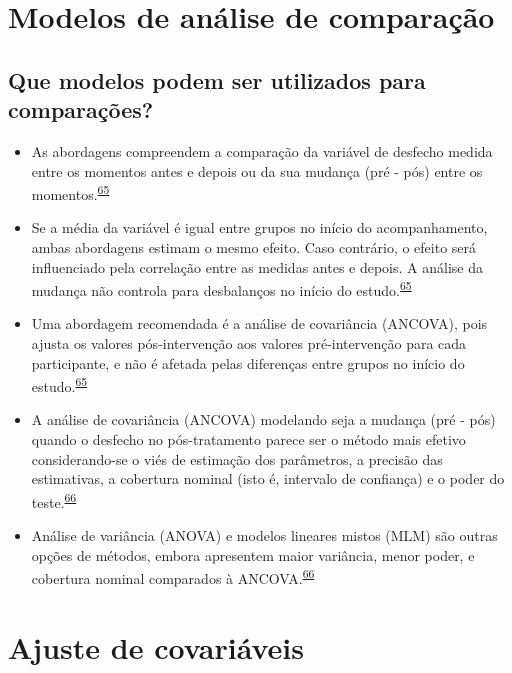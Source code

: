 \documentclass[
]{book}
\begin{document}
\hypertarget{metodos-comparacao}{%
\section{Modelos de análise de comparação}\label{metodos-comparacao}}

\hypertarget{que-modelos-podem-ser-utilizados-para-comparauxe7uxf5es}{%
\subsection{Que modelos podem ser utilizados para comparações?}\label{que-modelos-podem-ser-utilizados-para-comparauxe7uxf5es}}

\begin{itemize}
\item
  As abordagens compreendem a comparação da variável de desfecho medida entre os momentos antes e depois ou da sua mudança (pré - pós) entre os momentos.\textsuperscript{\protect\hyperlink{ref-Vickers2001}{65}}
\item
  Se a média da variável é igual entre grupos no início do acompanhamento, ambas abordagens estimam o mesmo efeito. Caso contrário, o efeito será influenciado pela correlação entre as medidas antes e depois. A análise da mudança não controla para desbalanços no início do estudo.\textsuperscript{\protect\hyperlink{ref-Vickers2001}{65}}
\item
  Uma abordagem recomendada é a análise de covariância (ANCOVA), pois ajusta os valores pós-intervenção aos valores pré-intervenção para cada participante, e não é afetada pelas diferenças entre grupos no início do estudo.\textsuperscript{\protect\hyperlink{ref-Vickers2001}{65}}
\item
  A análise de covariância (ANCOVA) modelando seja a mudança (pré - pós) quando o desfecho no pós-tratamento parece ser o método mais efetivo considerando-se o viés de estimação dos parâmetros, a precisão das estimativas, a cobertura nominal (isto é, intervalo de confiança) e o poder do teste.\textsuperscript{\protect\hyperlink{ref-OConnell2017}{66}}
\item
  Análise de variância (ANOVA) e modelos lineares mistos (MLM) são outras opções de métodos, embora apresentem maior variância, menor poder, e cobertura nominal comparados à ANCOVA.\textsuperscript{\protect\hyperlink{ref-OConnell2017}{66}}
\end{itemize}

\hypertarget{ajuste-de-covariaveis}{%
\section{Ajuste de covariáveis}\label{ajuste-de-covariaveis}}
\end{document}
